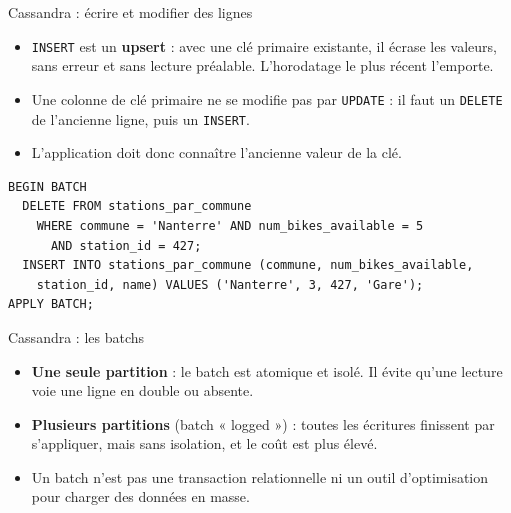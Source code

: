 \begin{frame}[fragile]{Cassandra : écrire et modifier des lignes}
    \begin{itemize}
        \item \texttt{INSERT} est un \textbf{upsert} : avec une clé primaire
              existante, il écrase les valeurs, sans erreur et sans lecture
              préalable. L'horodatage le plus récent l'emporte.
        \item Une colonne de clé primaire ne se modifie pas par \texttt{UPDATE}
              : il faut un \texttt{DELETE} de l'ancienne ligne, puis un
              \texttt{INSERT}.
        \item L'application doit donc connaître l'ancienne valeur de la clé.
    \end{itemize}
    \begin{verbatim}
BEGIN BATCH
  DELETE FROM stations_par_commune
    WHERE commune = 'Nanterre' AND num_bikes_available = 5
      AND station_id = 427;
  INSERT INTO stations_par_commune (commune, num_bikes_available,
    station_id, name) VALUES ('Nanterre', 3, 427, 'Gare');
APPLY BATCH;
\end{verbatim}
\end{frame}

\begin{frame}{Cassandra : les batchs}
    \begin{itemize}
        \item \textbf{Une seule partition} : le batch est atomique et isolé. Il
              évite qu'une lecture voie une ligne en double ou absente.
        \item \textbf{Plusieurs partitions} (batch « logged ») : toutes les
              écritures finissent par s'appliquer, mais sans isolation, et le
              coût est plus élevé.
        \item Un batch n'est pas une transaction relationnelle ni un outil
              d'optimisation pour charger des données en masse.
    \end{itemize}

\end{frame}

